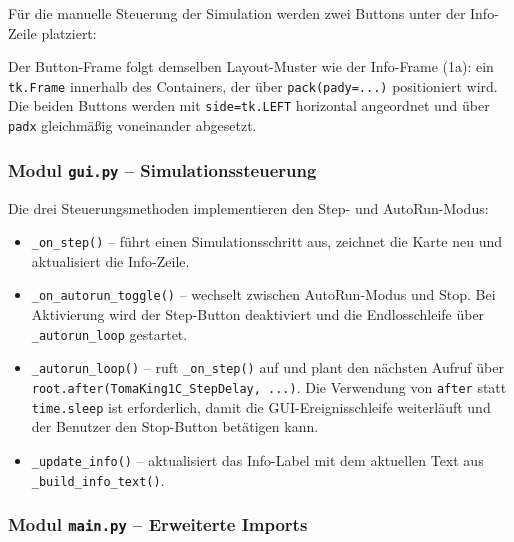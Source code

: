 Für die manuelle Steuerung der Simulation werden zwei Buttons unter der Info-Zeile platziert:



Der Button-Frame folgt demselben Layout-Muster wie der Info-Frame (1a): ein \texttt{tk.Frame} innerhalb des Containers, der über \texttt{pack(pady=...)} positioniert wird. Die beiden Buttons werden mit \texttt{side=tk.LEFT} horizontal angeordnet und über \texttt{padx} gleichmäßig voneinander abgesetzt.


\subsubsection{Modul \texttt{gui.py} – Simulationssteuerung}

Die drei Steuerungsmethoden implementieren den Step- und AutoRun-Modus:



\begin{itemize}
    \item \texttt{\_on\_step()} – führt einen Simulationsschritt aus, zeichnet die Karte neu und aktualisiert die Info-Zeile.
    \item \texttt{\_on\_autorun\_toggle()} – wechselt zwischen AutoRun-Modus und Stop. Bei Aktivierung wird der Step-Button deaktiviert und die Endlosschleife über \texttt{\_autorun\_loop} gestartet.
    \item \texttt{\_autorun\_loop()} – ruft \texttt{\_on\_step()} auf und plant den nächsten Aufruf über \texttt{root.after(TomaKing1C\_StepDelay, ...)}. Die Verwendung von \texttt{after} statt \texttt{time.sleep} ist erforderlich, damit die GUI-Ereignisschleife weiterläuft und der Benutzer den Stop-Button betätigen kann.
    \item \texttt{\_update\_info()} – aktualisiert das Info-Label mit dem aktuellen Text aus \texttt{\_build\_info\_text()}.
\end{itemize}


\subsubsection{Modul \texttt{main.py} – Erweiterte Imports}

